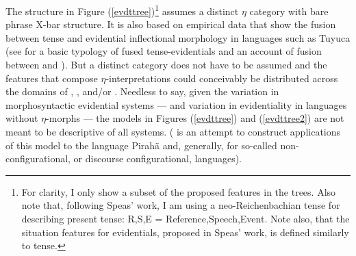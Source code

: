 \documentclass[11pt]{article}
\begin{document}
% 


The structure in Figure (\ref{evdttree})\footnote{For clarity, I only show a subset of the proposed features in the trees. Also note that, following Speas' work, I am using a neo-Reichenbachian tense for describing present tense: R,S,E = Reference,Speech,Event. Note also, that the situation features for evidentials, proposed in Speas' work, is defined similarly to tense.} assumes a distinct $\eta$ category with bare phrase X-bar structure. It is also based on empirical data that show the fusion between tense and evidential inflectional morphology in languages such as Tuyuca (see \citealt{bowles08fusedte} for a basic typology of fused tense-evidentials and an account of fusion between  and \obar{$\eta$}). But a distinct category does not have to be assumed and the features that compose $\eta$-interpretations could conceivably be distributed across the domains of , , and/or . Needless to say, given the variation in morphosyntactic evidential systems --- and variation in evidentiality in languages without $\eta$-morphs --- the models in Figures (\ref{evdttree}) and (\ref{evdttree2}) are not meant to be descriptive of all systems. (\citealt{bowles10wccfl28} is an attempt to construct applications of this model to the language Pirah\~a and, generally, for so-called non-configurational, or discourse configurational, languages).  
\end{document}
